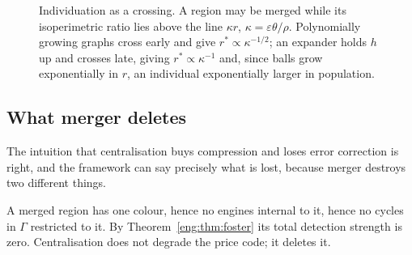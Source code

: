 \begin{figure}[t]
\centering
{}
\caption{Individuation as a crossing. A region may be merged while its
isoperimetric ratio lies above the line $\kappa r$, $\kappa =
\varepsilon\theta/\rho$. Polynomially growing graphs cross early and give
$r^\ast \propto \kappa^{-1/2}$; an expander holds $h$ up and crosses late,
giving $r^\ast \propto \kappa^{-1}$ and, since balls grow exponentially in
$r$, an individual exponentially larger in population.}
\label{eng:fig:crossing}
\end{figure}

\subsection{What merger deletes}\label{eng:S8.5}

The intuition that centralisation buys compression and loses error
correction is right, and the framework can say precisely what is lost,
because merger destroys two different things.

\begin{proposition}[Merger sets $\bt = 0$]\label{eng:merger-sets-0}
A merged region has one colour, hence no engines internal to it, hence no
cycles in $\Gamma$ restricted to it. By Theorem~\ref{eng:thm:foster} its total
detection strength is zero. Centralisation does not degrade the price code;
it deletes it.
\end{proposition}

